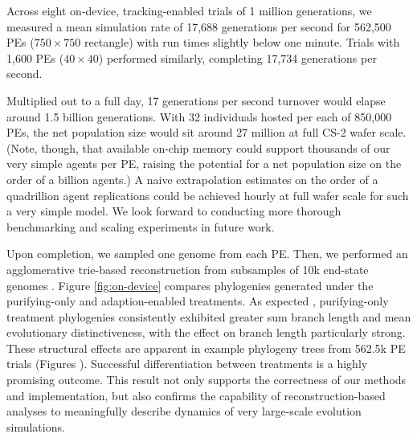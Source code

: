 Across eight on-device, tracking-enabled trials of 1 million generations, we measured a mean simulation rate of 17,688 generations per second for 562,500 PEs ($750\times750$ rectangle) with run times slightly below one minute.
Trials with 1,600 PEs ($40\times40$) performed similarly, completing 17,734 generations per second.

Multiplied out to a full day, 17 generations per second turnover would elapse around 1.5 billion generations.
With 32 individuals hosted per each of 850,000 PEs, the net population size would sit around 27 million at full CS-2 wafer scale.
(Note, though, that available on-chip memory could support thousands of our very simple agents per PE, raising the potential for a net population size on the order of a billion agents.)
A naive extrapolation estimates on the order of a quadrillion agent replications could be achieved hourly at full wafer scale for such a very simple model.
We look forward to conducting more thorough benchmarking and scaling experiments in future work.

Upon completion, we sampled one genome from each PE.
Then, we performed an agglomerative trie-based reconstruction from subsamples of 10k end-state genomes \citep{moreno2024analysis}.
Figure \ref{fig:on-device} compares phylogenies generated under the purifying-only and adaption-enabled treatments.
As expected \citep{moreno2023toward}, purifying-only treatment phylogenies consistently exhibited greater sum branch length and mean evolutionary distinctiveness, with the effect on branch length particularly strong.
These structural effects are apparent in example phylogeny trees from 562.5k PE trials (Figures ).
Successful differentiation between treatments is a highly promising outcome.
This result not only supports the correctness of our methods and implementation, but also confirms the capability of reconstruction-based analyses to meaningfully describe dynamics of very large-scale evolution simulations.
